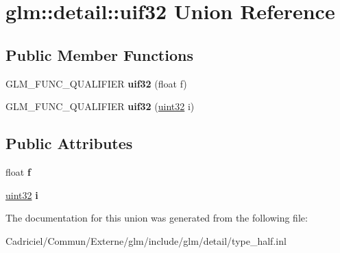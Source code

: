 \hypertarget{unionglm_1_1detail_1_1uif32}{}\section{glm\+:\+:detail\+:\+:uif32 Union Reference}
\label{unionglm_1_1detail_1_1uif32}
\subsection*{Public Member Functions}
\begin{DoxyCompactItemize}
\item 
G\+L\+M\+\_\+\+F\+U\+N\+C\+\_\+\+Q\+U\+A\+L\+I\+F\+I\+ER {\bfseries uif32} (float f)\hypertarget{unionglm_1_1detail_1_1uif32_ae86c2bd42a88f11e3217d14e46606971}{}\label{unionglm_1_1detail_1_1uif32_ae86c2bd42a88f11e3217d14e46606971}

\item 
G\+L\+M\+\_\+\+F\+U\+N\+C\+\_\+\+Q\+U\+A\+L\+I\+F\+I\+ER {\bfseries uif32} (\hyperlink{group__gtc__type__precision_ga202b6a53c105fcb7e531f9b443518451}{uint32} i)\hypertarget{unionglm_1_1detail_1_1uif32_a3d5981678c930776894daf8e94295fe2}{}\label{unionglm_1_1detail_1_1uif32_a3d5981678c930776894daf8e94295fe2}

\end{DoxyCompactItemize}
\subsection*{Public Attributes}
\begin{DoxyCompactItemize}
\item 
float {\bfseries f}\hypertarget{unionglm_1_1detail_1_1uif32_a5f697f84c5a8ec72c2f3a4f705f5bde8}{}\label{unionglm_1_1detail_1_1uif32_a5f697f84c5a8ec72c2f3a4f705f5bde8}

\item 
\hyperlink{group__gtc__type__precision_ga202b6a53c105fcb7e531f9b443518451}{uint32} {\bfseries i}\hypertarget{unionglm_1_1detail_1_1uif32_a981c1c59e160db23c73908cd7e629229}{}\label{unionglm_1_1detail_1_1uif32_a981c1c59e160db23c73908cd7e629229}

\end{DoxyCompactItemize}


The documentation for this union was generated from the following file\+:\begin{DoxyCompactItemize}
\item 
Cadriciel/\+Commun/\+Externe/glm/include/glm/detail/type\+\_\+half.\+inl\end{DoxyCompactItemize}

